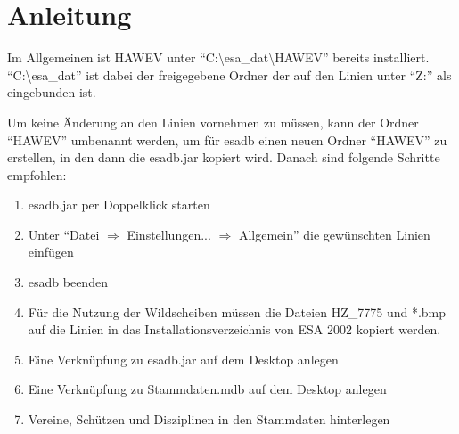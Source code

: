 \section{Anleitung}
Im Allgemeinen ist HAWEV unter "`C:\textbackslash esa\_dat\textbackslash HAWEV"' bereits installiert.
"`C:\textbackslash esa\_dat"' ist dabei der freigegebene Ordner der auf den Linien unter
"`Z:"' als  eingebunden ist.

Um keine Änderung an den Linien vornehmen zu müssen, kann der Ordner "`HAWEV"' umbenannt werden, um für esadb einen
neuen Ordner "`HAWEV"' zu erstellen, in den dann die esadb.jar kopiert wird. Danach sind folgende Schritte empfohlen:
\begin{enumerate}
  \item esadb.jar per Doppelklick starten
  \item Unter "`Datei $ \Rightarrow $ Einstellungen... $ \Rightarrow $ Allgemein"' die gewünschten Linien einfügen
  \item esadb beenden
  \item Für die Nutzung der Wildscheiben müssen die Dateien HZ\_7775 und *.bmp auf die Linien in das Installationsverzeichnis von ESA 2002 kopiert werden.
  \item Eine Verknüpfung zu esadb.jar auf dem Desktop anlegen
  \item Eine Verknüpfung zu Stammdaten.mdb auf dem Desktop anlegen
  \item Vereine, Schützen und Disziplinen in den Stammdaten hinterlegen
\end{enumerate}

